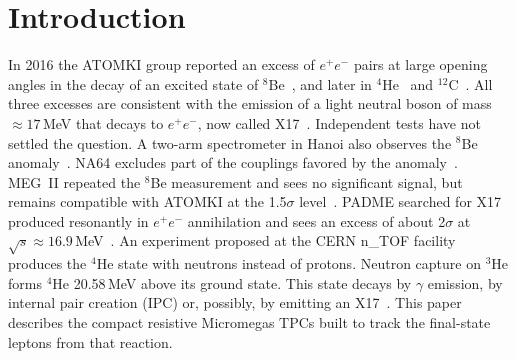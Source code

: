 \section{Introduction}\label{sec:intro}

In 2016 the ATOMKI group reported an excess of $e^+e^-$ pairs at large opening angles in the decay of an excited
state of $^8$Be~\cite{Krasznahorkay2016}, and later in $^4$He~\cite{Krasznahorkay2021} and
$^{12}$C~\cite{Krasznahorkay2022}. All three excesses are consistent with the emission of a light neutral boson of mass
${\approx}17$\,MeV that decays to $e^+e^-$, now called X17~\cite{Feng2016}. Independent tests have not settled the question.
A two-arm spectrometer in Hanoi also observes the $^8$Be anomaly~\cite{Anh2024}. NA64 excludes part of the couplings
favored by the anomaly~\cite{NA64_2018,NA64_2020}. MEG~II repeated the $^8$Be measurement and sees no significant signal, but
remains compatible with ATOMKI at the 1.5$\sigma$ level~\cite{MEGII2024}. PADME searched for X17 produced
resonantly in $e^+e^-$ annihilation and sees an excess of about 2$\sigma$ at $\sqrt{s}\approx16.9$\,MeV~\cite{PADME2025}.
An experiment proposed at the CERN n\_TOF facility~\cite{nTOFX17proposal,Gustavino2025} produces the $^4$He state with
neutrons instead of protons. Neutron capture on $^3$He forms $^4$He 20.58\,MeV above its ground state. This state decays by
$\gamma$ emission, by internal pair creation (IPC) or, possibly, by emitting an X17~\cite{Viviani2022}. This paper
describes the compact resistive Micromegas TPCs built to track the final-state leptons from that reaction.

